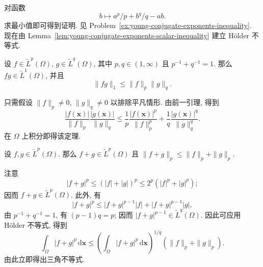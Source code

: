 对函数 \[b\mapsto a^p/p+b^q/q-ab.\] 求最小值即可得到证明. 见 Problem~\ref{ex:young-conjugate-exponents-inequality}. 现在由 Lemma~\ref{lem:young-conjugate-exponents-scalar-inequality} 建立 Hölder 不等式.

\begin{Theorem}
\label{thm:continuous-functions-holder-inequality}
设 $f\in\widetilde L^p(\Omega)$, $g\in\widetilde L^q(\Omega)$, 其中 $p,q\in(1,\infty)$ 且 $p^{-1}+q^{-1}=1$. 那么 $fg\in\widetilde L^1(\Omega)$, 并且
\begin{equation}\label{eq:continuous-functions-holder-inequality}
\|fg\|_1\leq\|f\|_p\|g\|_q.
\end{equation}

\end{Theorem}

\begin{Proof}
只需假设 $\|f\|_p\ne0$, $\|g\|_q\ne0$ 以排除平凡情形. 由前一引理, 得到
\begin{equation}\label{eq:holder-normalized-young-pointwise-bound}
\dfrac{|f(\bm{x})|}{\|f\|_p}\dfrac{|g(\bm{x})|}{\|g\|_q}\leq\dfrac1p\dfrac{|f(\bm{x})|^p}{\|f\|_p^p}+\dfrac1q\dfrac{|g(\bm{x})|^q}{\|g\|_q^q}.
\end{equation}
在 $\Omega$ 上积分即得该定理.
\end{Proof}

\begin{Theorem}
\label{thm:continuous-functions-lp-triangle-inequality}
设 $f,g\in\widetilde L^p(\Omega)$. 那么 $f+g\in\widetilde L^p(\Omega)$ 且 $\|f+g\|_p\leq\|f\|_p+\|g\|_p$.
\end{Theorem}

\begin{Proof}
注意
\begin{equation}\label{eq:lp-sum-integrability-bound}
|f+g|^p\leq(|f|+|g|)^p\leq2^p(|f|^p+|g|^p);
\end{equation}
因而 $f+g\in\widetilde L^p(\Omega)$. 此外, 有
\begin{equation}\label{eq:lp-triangle-pointwise-product-bound}
|f+g|^p\leq|f+g|^{p-1}|f|+|f+g|^{p-1}|g|,
\end{equation}
由 $p^{-1}+q^{-1}=1$, 有 $(p-1)q=p$; 因而 $|f+g|^{p-1}\in\widetilde L^q(\Omega)$. 因此可应用 Hölder 不等式, 得到
\begin{equation}\label{eq:lp-triangle-holder-integral-bound}
\int_\Omega|f+g|^p\,\mathrm{d}\bm{x}\leq\left(\int_\Omega|f+g|^p\,\mathrm{d}\bm{x}\right)^{1/q}(\|f\|_p+\|g\|_p).
\end{equation}
由此立即得出三角不等式.
\end{Proof}

